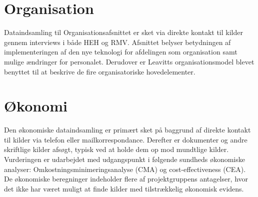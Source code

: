 \section{Organisation}
Dataindsamling til Organisationsafsnittet er sket via direkte kontakt til kilder gennem interviews i både HEH og RMV. Afsnittet belyser betydningen af implementeringen af den nye teknologi for afdelingen som organisation samt mulige ændringer for personalet. Derudover er Leavitts organisationsmodel blevet benyttet til at beskrive de fire organisatoriske hovedelementer.

\section{Økonomi}
Den økonomiske dataindsamling er primært sket på baggrund af direkte kontakt til kilder via telefon eller mailkorrespondance. Derefter er dokumenter og andre skriftlige kilder afsøgt, typisk ved at holde dem op mod mundtlige kilder. Vurderingen er udarbejdet med udgangspunkt i følgende sundheds økonomiske analyser: Omkostningsminimeringsanalyse (CMA) og cost-effectiveness (CEA). De økonomiske beregninger indeholder flere af projektgruppens antagelser, hvor det ikke har været muligt at finde kilder med tilstrækkelig økonomisk evidens. 